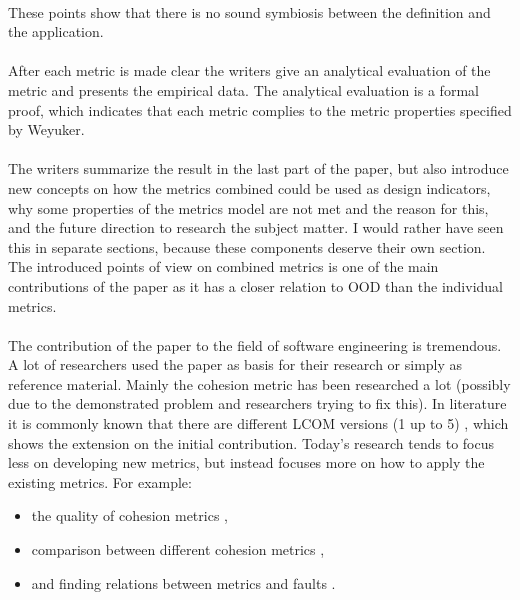 \paragraph{}
These points show that there is no sound symbiosis between the definition and the application.

\paragraph{}
After each metric is made clear the writers give an analytical evaluation of the metric and presents the empirical
data. The analytical evaluation is a formal proof, which indicates that each metric complies to the metric properties
specified by Weyuker.

\paragraph{}
The writers summarize the result in the last part of the paper, but also introduce new concepts on how the metrics
combined could be used as design indicators, why some properties of the metrics model are not met and the reason for this, and the
future direction to research the subject matter. I would rather have seen this in separate sections, because these
components deserve their own section. The introduced points of view on combined metrics is one of the main contributions
of the paper as it has a closer relation to OOD than the individual metrics.

\paragraph{}
The contribution of the paper to the field of software engineering is tremendous. A lot of researchers used the paper
as basis for their research or simply as reference material. Mainly the cohesion metric has been researched a lot (possibly
due to the demonstrated problem and researchers trying to fix this). In literature it is commonly known that there are
different LCOM versions (1 up to 5) \autocite{TOOLS-USA-2003-BadriB04}, which shows the extension on the initial contribution. Today's research
tends to focus less on developing new metrics, but instead focuses more on how to apply the existing metrics. For example:

\begin{itemize}
\item the quality of cohesion metrics \autocite{DESOUKY} \autocite{JOHARI},
\item comparison between different cohesion metrics \autocite{JOSHI},
\item and finding relations between metrics and faults \autocite{LU} \autocite{SINGH} \autocite{DALLAL}.
\end{itemize}

